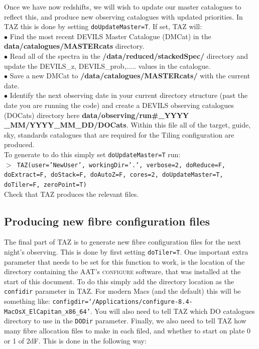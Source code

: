 \documentclass[12pt]{article}
\begin{document}
Once we have now redshifts, we will wish to update our master catalogues to reflect this, and produce new observing catalogues with updated priorities. In TAZ this is done by setting \texttt{doUpdateMaster=T}. If set, TAZ will:\\

$\bullet$ Find the most recent DEVILS Master Catalogue (DMCat) in the \textbf{data/catalogues/MASTERcats} directory.\\


$\bullet$ Read all of the spectra in the \textbf{/data/reduced/stackedSpec/} directory and update the DEVILS\_z,  DEVILS\_prob,..... values in the catalogue.\\

$\bullet$ Save a new DMCat to \textbf{/data/catalogues/MASTERcats/} with the current date. \\

$\bullet$ Identify the next observing date in your current directory structure (past the date you are running the code) and create a DEVILS observing catalogues (DOCats) directory here \textbf{data/observing/run\#\_YYYY \_MM/YYYY\_MM\_DD/DOCats}. Within this file all of the target, guide, sky, standards catalogues that are required for the Tiling configuration are produced.\\

To generate to do this simply set \texttt{doUpdateMaster=T} run:\\

  \hspace{10mm} \texttt{$>$ TAZ(user='NewUser', workingDir='.', verbose=2, doReduce=F, doExtract=F, doStack=F, doAutoZ=F,  cores=2, doUpdateMaster=T, doTiler=F, zeroPoint=T)}\\  
  
  Check that TAZ produces the relevant files. 


 \subsection{Producing new fibre configuration files}
 
 The final part of TAZ is to generate new fibre configuration files for the next night's observing. This is done by first setting \texttt{doTiler=T}. One important extra parameter that needs to be set for this function to work, is the location of the directory containing the AAT's \textsc{configure} software, that was installed at the start of this document. To do this simply add the directory location as the \texttt{confidir} parameter in TAZ. For modern Macs (and the default) this will be something like: \texttt{configdir=`/Applications/configure-8.4-MacOsX\_ElCapitan\_x86\_64'}. You will also need to tell TAZ which DO catalogues directory to use in the \texttt{DODir} parameter. Finally, we also need to tell TAZ how many fibre allocation files to make in each filed, and whether to start on plate 0 or 1 of 2dF. This is done in the following way: \\
 
\end{document}
